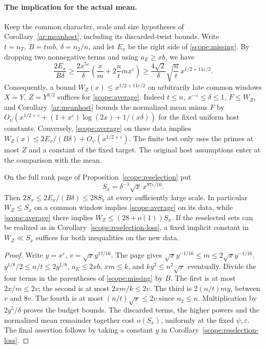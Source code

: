 \paragraph{The implication for the actual mean.}
Keep the common character, scale and size hypotheses of
Corollary~\ref{ar:meanhost}, including its discarded-twist bounds.
Write \(t=n_T,\ B=tmb,\ \delta=n_2/n\), and let \(E_x\) be the
right side of \eqref{scope:missing}. By dropping two nonnegative
terms and using \(a_E\ge xb\), we have
\[
 \frac{2E_x}{B\delta}
 \ge \frac{2x^{5\varepsilon}}{\delta}
       \left(\frac{x}{m}+2\frac{n}{t}m x^\varepsilon\right)
 \ge \frac{4\sqrt2}{\delta}\sqrt{\frac nt}\,
                   x^{1/2+11\varepsilon/2}.
\]
Consequently, a bound \(W_Z(x)\le x^{1/2+11\varepsilon/2}\)
on arbitrarily late common windows \(X=Y,\ Z=Y^{3/2}\) suffices
for \eqref{scope:average}. Indeed \(t\le n\), \(x^{-\varepsilon}
\le\delta\le1\), \(F\le W_Z\), and
Corollary~\ref{ar:meanhost} bounds the normalized mean minus \(F\)
by \(O_\psi(x^{1/2+\varepsilon}+(1+x^\varepsilon)\log(2x)
+1/(x\delta))\) for the fixed uniform host constants.
Conversely, \eqref{scope:average} on these data implies
\(W_Z(x)\le 2E_x/(B\delta)+O_\psi(x^{1/2+\varepsilon})\).
The finite test only uses the primes at most \(Z\) and a constant
of the fixed target. The original host assumptions enter at the
comparison with the mean.

\begin{corollary}\label{pref:scale}
On the full rank page of Proposition~\ref{scope:reselection} put
\[
     S_x=\delta^{-1}\sqrt{x}\,x^{97\varepsilon/16}.
\]
Then \(2S_x\le 2E_x/(B\delta)\le28S_x\) at every sufficiently
large scale. In particular \(W_Z\le S_x\) on a common window
implies \eqref{scope:average} on its data, while
\eqref{scope:average} there implies \(W_Z\le(28+o(1))S_x\).
If the reselected sets can be realized as in
Corollary~\ref{scope:reselection-loss}, a fixed implicit constant
in \(W_Z\ll S_x\) suffices for both inequalities on the new data.
\end{corollary}
\begin{proof}
Write \(y=x^\varepsilon\), \(v=\sqrt{x}y^{17/16}\).
The page gives \(\sqrt{x}y^{-1/16}\le m\le2\sqrt{x}y^{-1/16}\),
\(y^{1/8}/2\le n/t\le2y^{1/8}\), \(a_E\le2xb\),
\(xm\le k\), and \(ky^2\le n^2\sqrt{x}\) eventually.
Divide the four terms in the parentheses of \eqref{scope:missing}
by \(B\). The first is at most \(2x/m\le2v\);
the second is at most \(2xm/k\le2v\).
The third is \(2(n/t)my\), between \(v\) and \(8v\).
The fourth is at most \((n/t)\sqrt{x}\le2v\) since \(n_2\le n\).
Multiplication by \(2y^5/\delta\) proves the budget bounds.
The discarded terms, the higher powers and the normalized mean
remainder together cost \(o(S_x)\), uniformly at the fixed
\(\psi,\varepsilon\). The final assertion follows by taking a
constant \(g\) in Corollary~\ref{scope:reselection-loss}.
\end{proof}

